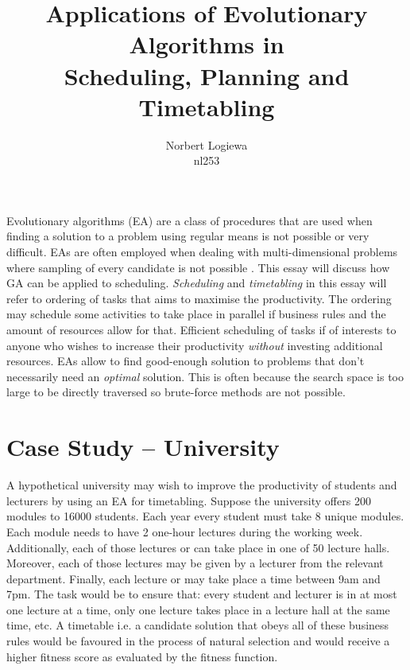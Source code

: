 \documentclass[a4paper, 12pt, titlepage]{article}
\date{} %
\author{Norbert Logiewa\\nl253}
\title{Applications of Evolutionary Algorithms in \\Scheduling, Planning and Timetabling}
\begin{document}
\maketitle

Evolutionary algorithms (EA) are a class of procedures that are
used when finding a solution to a problem using regular means is not
possible or very difficult. EAs are often employed when dealing with
multi-dimensional problems where sampling of every candidate is not
possible \cite[p.~29]{floreano2008}. This essay will discuss how GA can
be applied to scheduling.  \emph{Scheduling} and \emph{timetabling}
in this essay will refer to ordering of tasks that aims to maximise
the productivity.  The ordering may schedule some activities to take
place in parallel if business rules and the amount of resources allow
for that.  Efficient scheduling of tasks if of interests to anyone who
wishes to increase their productivity \emph{without} investing additional
resources.  EAs allow to find good-enough solution to problems that don't
necessarily need an \emph{optimal} solution\cite[p.~44]{heaton2014}.
This is often because the search space is too large to be directly
traversed so brute-force methods are not possible.


\section*{Case Study -- University}

A hypothetical university may wish to improve the productivity of students
and lecturers by using an EA for timetabling. Suppose the university
offers 200 modules to 16000 students. Each year every student must take 8
unique modules. Each module needs to have 2 one-hour lectures during the
working week. Additionally, each of those lectures or can take place in
one of 50 lecture halls. Moreover, each of those lectures may be given
by a lecturer from the relevant department.  Finally, each lecture or
may take place a time between 9am and 7pm.  The task would be to ensure
that: every student and lecturer is in at most one lecture at a time,
only one lecture takes place in a lecture hall at the same time, etc.
A timetable i.e. a candidate solution that obeys all of these business
rules would be favoured in the process of natural selection and would
receive a higher fitness score as evaluated by the fitness function.
\end{document}
